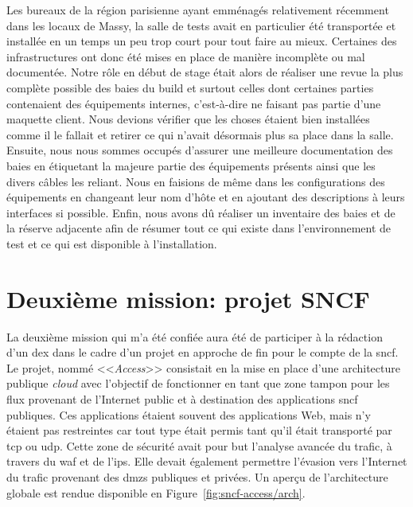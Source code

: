 \documentclass[12pt, oneside, a4paper, titlepage]{report}
\begin{document}
Les bureaux de la région parisienne ayant emménagés relativement récemment dans
les locaux de Massy, la salle de tests avait en particulier été transportée et
installée en un temps un peu trop court pour tout faire au mieux. Certaines des
infrastructures ont donc été mises en place de manière incomplète ou mal
documentée. Notre rôle en début de stage était alors de réaliser une revue la
plus complète possible des baies du \gls{build} et surtout celles dont certaines
parties contenaient des équipements internes, c'est-à-dire ne faisant pas partie
d'une maquette client. Nous devions vérifier que les choses étaient bien
installées comme il le fallait et retirer ce qui n'avait désormais plus sa place
dans la salle. Ensuite, nous nous sommes occupés d'assurer une meilleure
documentation des baies en étiquetant la majeure partie des équipements présents
ainsi que les divers câbles les reliant. Nous en faisions de même dans les
configurations des équipements en changeant leur nom d'hôte et en ajoutant des
descriptions à leurs interfaces si possible. Enfin, nous avons dû réaliser un
inventaire des baies et de la réserve adjacente afin de résumer tout ce qui
existe dans l'environnement de test et ce qui est disponible à l'installation.


\section{Deuxième mission: projet SNCF}%
\label{sec:mission::deuz}

La deuxième mission qui m'a été confiée aura été de participer à la rédaction
d'un \acrfull{dex} dans le cadre d'un projet en approche de fin pour le compte
de la \gls{sncf}. Le projet, nommé <<\textit{Access}>> consistait en la mise en
place d'une architecture publique \textit{cloud} avec l'objectif de fonctionner
en tant que zone tampon pour les flux provenant de l'Internet public et à
destination des applications \gls{sncf} publiques. Ces applications étaient
souvent des applications Web, mais n'y étaient pas restreintes car tout type
était permis tant qu'il était transporté par \gls{tcp} ou \gls{udp}. Cette zone
de sécurité avait pour but l'analyse avancée du trafic, à travers du \gls{waf}
et de l'\gls{ips}.  Elle devait également permettre l'évasion vers l'Internet du
trafic provenant des \glspl{dmz} publiques et privées. Un aperçu de
l'architecture globale est rendue disponible en
Figure~\ref{fig:sncf-access/arch}.
\end{document}
